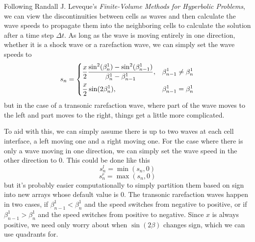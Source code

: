 \documentclass[12pt]{article}
\begin{document}
Following Randall J. Leveque's \textit{Finite-Volume Methods for Hyperbolic Problems}, we can view
the discontinuities between cells as waves and then calculate the wave speeds to propagate them into
the neighboring cells to calculate the solution after a time step $\Delta t$. As long as the wave is
moving entirely in one direction, whether it is a shock wave or a rarefaction wave, we can simply
set the wave speeds to
\[ s_n = \begin{dcases}
    \frac{x}{2} \frac{\sin^2(\beta_n^1) - \sin^2(\beta_{n-1}^1)}{\beta_n^1 - \beta_{n-1}^1},
    & \beta_{n-1}^1 \ne \beta_n^1 \\
    \frac{x}{2} \sin(2\beta_n^1), & \beta_{n-1}^1 = \beta_n^1
\end{dcases} \]
but in the case of a transonic rarefaction wave, where part of the wave moves to the left and part
moves to the right, things get a little more complicated.

To aid with this, we can simply assume there is up to two waves at each cell interface, a left
moving one and a right moving one. For the case where there is only a wave moving in one direction,
we can simply set the wave speed in the other direction to 0. This could be done like this
\[ s^l_n = \min(s_n,0) \]
\[ s^r_n = \max(s_n,0) \]
but it's probably easier computationally to simply partition them based on sign into new arrays
whose default value is 0. The transonic rarefaction waves happen in two cases, if $\beta_{n-1}^1 <
\beta_n^1$ and the speed switches from negative to positive, or if $\beta_{n-1}^1 > \beta_n^1$ and
the speed switches from positive to negative. Since $x$ is always positive, we need only worry about
when $\sin(2\beta)$ changes sign, which we can use quadrants for.
\end{document}
